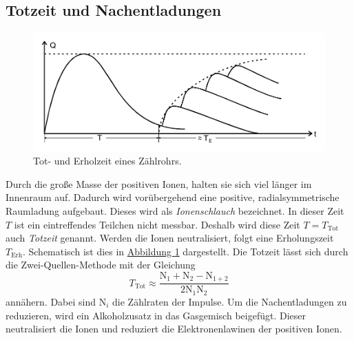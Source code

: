 \subsection{Totzeit und Nachentladungen}\label{sec:Nachentladungen}
\begin{figure} [H]
    \center
    \includegraphics[width=0.8\linewidth]{pictures/Diagramm2.pdf}
    \caption{Tot- und Erholzeit eines Zählrohrs.}\label{fig:Diagramm2}
\end{figure}
Durch die große Masse der positiven Ionen, halten sie sich viel länger im Innenraum auf.
Dadurch wird vorübergehend eine positive, radialsymmetrische Raumladung aufgebaut.
Dieses wird als \textit{Ionenschlauch} bezeichnet.
In dieser Zeit $T$ ist ein eintreffendes Teilchen nicht messbar.
Deshalb wird diese Zeit $T = T_\text{Tot}$ auch \textit{Totzeit} genannt.
Werden die Ionen neutralisiert, folgt eine Erholungszeit $T_\text{Erh}$.
Schematisch ist dies in \hyperref[fig:Diagramm2]{Abbildung \ref{fig:Diagramm2}} dargestellt.
Die Totzeit lässt sich durch die Zwei-Quellen-Methode mit der Gleichung
\begin{equation} \label{eq:T_Tot}
    T_\text{Tot} \approx \frac{\text{N}_1 + \text{N}_2 - \text{N}_{1+2}}{2\text{N}_1 \text{N}_2}
\end{equation}
annähern.
Dabei sind $\text{N}_i$ die Zählraten der Impulse.
Um die Nachentladungen zu reduzieren, wird ein Alkoholzusatz in das Gasgemisch beigefügt.
Dieser neutralisiert die Ionen und reduziert die Elektronenlawinen der positiven Ionen.

